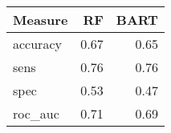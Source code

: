 \begin{table}
\fontsize{12.0pt}{14.4pt}\selectfont
\begin{tabular*}{\linewidth}{@{\extracolsep{\fill}}lrr}
\toprule
Measure & RF & BART \\ 
\midrule\addlinespace[2.5pt]
accuracy & 0.67 & 0.65 \\ 
sens & 0.76 & 0.76 \\ 
spec & 0.53 & 0.47 \\ 
roc\_auc & 0.71 & 0.69 \\ 
\bottomrule
\end{tabular*}
\end{table}


